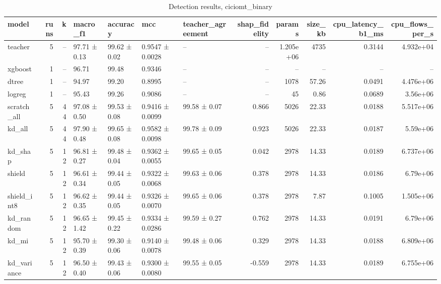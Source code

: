 \begin{table}
\caption{Detection results, ciciomt_binary}
\begin{tabular}{lrrllllrrrrr}
\toprule
model & runs & k & macro_f1 & accuracy & mcc & teacher_agreement & shap_fidelity & params & size_kb & cpu_latency_b1_ms & cpu_flows_per_s \\
\midrule
teacher & 5 & -- & 97.71 ± 0.13 & 99.62 ± 0.02 & 0.9547 ± 0.0028 & -- & -- & 1.205e+06 & 4735 & 0.3144 & 4.932e+04 \\
xgboost & 1 & -- & 96.71 & 99.48 & 0.9346 & -- & -- & -- & -- & -- & -- \\
dtree & 1 & -- & 94.97 & 99.20 & 0.8995 & -- & -- & 1078 & 57.26 & 0.0491 & 4.476e+06 \\
logreg & 1 & -- & 95.43 & 99.26 & 0.9086 & -- & -- & 45 & 0.86 & 0.0689 & 3.56e+06 \\
scratch_all & 5 & 44 & 97.08 ± 0.50 & 99.53 ± 0.08 & 0.9416 ± 0.0099 & 99.58 ± 0.07 & 0.866 & 5026 & 22.33 & 0.0188 & 5.517e+06 \\
kd_all & 5 & 44 & 97.90 ± 0.48 & 99.65 ± 0.08 & 0.9582 ± 0.0098 & 99.78 ± 0.09 & 0.923 & 5026 & 22.33 & 0.0187 & 5.59e+06 \\
kd_shap & 5 & 12 & 96.81 ± 0.27 & 99.48 ± 0.04 & 0.9362 ± 0.0055 & 99.65 ± 0.05 & 0.042 & 2978 & 14.33 & 0.0189 & 6.737e+06 \\
shield & 5 & 12 & 96.61 ± 0.34 & 99.44 ± 0.05 & 0.9322 ± 0.0068 & 99.63 ± 0.06 & 0.378 & 2978 & 14.33 & 0.0186 & 6.79e+06 \\
shield_int8 & 5 & 12 & 96.62 ± 0.35 & 99.44 ± 0.05 & 0.9326 ± 0.0070 & 99.65 ± 0.06 & 0.378 & 2978 & 7.87 & 0.1005 & 1.505e+06 \\
kd_random & 5 & 12 & 96.65 ± 1.42 & 99.45 ± 0.22 & 0.9334 ± 0.0286 & 99.59 ± 0.27 & 0.762 & 2978 & 14.33 & 0.0191 & 6.79e+06 \\
kd_mi & 5 & 12 & 95.70 ± 0.39 & 99.30 ± 0.06 & 0.9140 ± 0.0078 & 99.48 ± 0.06 & 0.329 & 2978 & 14.33 & 0.0188 & 6.809e+06 \\
kd_variance & 5 & 12 & 96.50 ± 0.40 & 99.43 ± 0.06 & 0.9300 ± 0.0080 & 99.55 ± 0.05 & -0.559 & 2978 & 14.33 & 0.0189 & 6.755e+06 \\
\bottomrule
\end{tabular}
\end{table}
